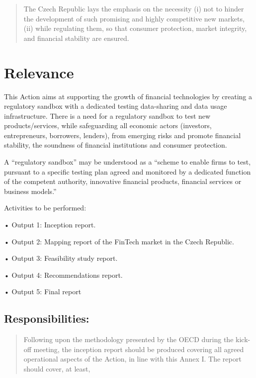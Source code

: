 \documentclass[
]{book}
\begin{document}
\begin{quote}
The Czech Republic lays the emphasis on the necessity (i) not to hinder the development of such promising and highly competitive new markets, (ii) while regulating them, so that consumer protection, market integrity, and financial stability are ensured.
\end{quote}

\hypertarget{relevance}{%
\section{Relevance}\label{relevance}}

This Action aims at supporting the growth of financial technologies by creating a regulatory sandbox with a dedicated testing data-sharing and data usage infrastructure. There is a need for a regulatory sandbox to test new products/services, while safeguarding all economic actors (investors, entrepreneurs, borrowers, lenders), from emerging risks and promote financial stability, the soundness of financial institutions and consumer protection.

A ``regulatory sandbox'' may be understood as a ``scheme to enable firms to test, pursuant to a specific testing plan agreed and monitored by a dedicated function of the competent authority, innovative financial products, financial services or business models.''

Activities to be performed:

• Output 1: Inception report.

• Output 2: Mapping report of the FinTech market in the Czech Republic.

• Output 3: Feasibility study report.

• Output 4: Recommendations report.

• Output 5: Final report

\hypertarget{responsibilities}{%
\subsection{Responsibilities:}\label{responsibilities}}

\begin{quote}
Following upon the methodology presented by the OECD during the kick-off meeting, the inception report should be produced covering all agreed operational aspects of the Action, in line with this Annex I. The report should cover, at least,
\end{quote}
\end{document}
